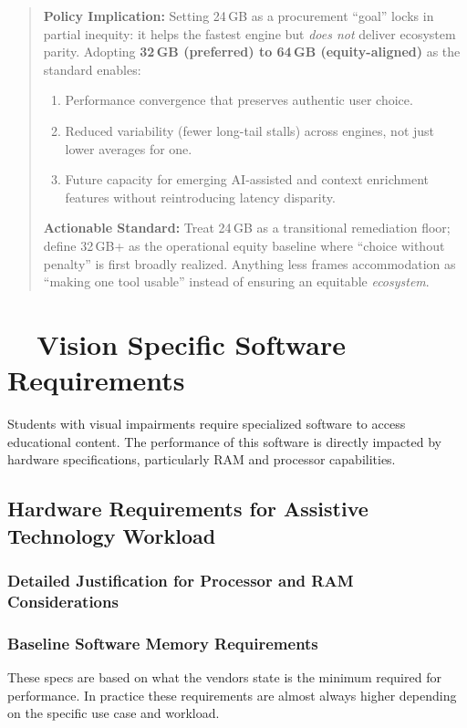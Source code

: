 \begin{quote}
	\textbf{Policy Implication:} Setting 24\,GB as a procurement “goal” locks in partial inequity: it helps the fastest engine but \emph{does not} deliver ecosystem parity. Adopting \textbf{32\,GB (preferred) to 64\,GB (equity-aligned)} as the standard enables:
	\begin{enumerate}
		\item Performance convergence that preserves authentic user choice.
		\item Reduced variability (fewer long-tail stalls) across engines, not just lower averages for one.
		\item Future capacity for emerging AI‑assisted and context enrichment features without reintroducing latency disparity.
	\end{enumerate}
	\textbf{Actionable Standard:} Treat 24\,GB as a transitional remediation floor; define 32\,GB+ as the operational equity baseline where “choice without penalty” is first broadly realized. Anything less frames accommodation as “making one tool usable” instead of ensuring an equitable \emph{ecosystem}.
\end{quote}

\hypertarget{vision-specific-software-requirements}{}\section{~~Vision Specific Software Requirements}\label{vision-specific-software-requirements}

Students with visual impairments require specialized software to access educational content. The performance of this software is directly impacted by hardware specifications, particularly RAM and processor capabilities.

\subsection{Hardware Requirements for Assistive Technology Workload}\label{hardware-justification-ai-ram}

\subsubsection{Detailed Justification for Processor and RAM Considerations}

\subsubsection{Baseline Software Memory Requirements}
These  specs are based on what the vendors state is the minimum required for performance. In practice these requirements are almost always higher depending on the specific use case and workload.

